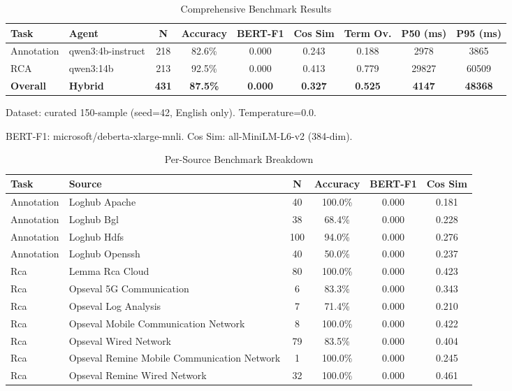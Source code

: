
\begin{table}[h]
\centering
\caption{Comprehensive Benchmark Results}
\label{tab:comprehensive-results}
\begin{tabular}{llccccccc}
\toprule
\textbf{Task} & \textbf{Agent} & \textbf{N} & \textbf{Accuracy} & \textbf{BERT-F1} & \textbf{Cos Sim} & \textbf{Term Ov.} & \textbf{P50 (ms)} & \textbf{P95 (ms)} \\
\midrule
Annotation & qwen3:4b-instruct & 218 & 82.6\% & 0.000 & 0.243 & 0.188 & 2978 & 3865 \\
RCA & qwen3:14b & 213 & 92.5\% & 0.000 & 0.413 & 0.779 & 29827 & 60509 \\
\midrule
\textbf{Overall} & \textbf{Hybrid} & \textbf{431} & \textbf{87.5\%} & \textbf{0.000} & \textbf{0.327} & \textbf{0.525} & \textbf{4147} & \textbf{48368} \\
\bottomrule
\end{tabular}
\begin{tablenotes}
\small
\item Dataset: curated 150-sample (seed=42, English only). Temperature=0.0.
\item BERT-F1: microsoft/deberta-xlarge-mnli. Cos Sim: all-MiniLM-L6-v2 (384-dim).
\end{tablenotes}
\end{table}


\begin{table}[h]
\centering
\caption{Per-Source Benchmark Breakdown}
\label{tab:per-source}
\begin{tabular}{llcccc}
\toprule
\textbf{Task} & \textbf{Source} & \textbf{N} & \textbf{Accuracy} & \textbf{BERT-F1} & \textbf{Cos Sim} \\
\midrule
Annotation & Loghub Apache & 40 & 100.0\% & 0.000 & 0.181 \\
Annotation & Loghub Bgl & 38 & 68.4\% & 0.000 & 0.228 \\
Annotation & Loghub Hdfs & 100 & 94.0\% & 0.000 & 0.276 \\
Annotation & Loghub Openssh & 40 & 50.0\% & 0.000 & 0.237 \\
Rca & Lemma Rca Cloud & 80 & 100.0\% & 0.000 & 0.423 \\
Rca & Opseval 5G Communication & 6 & 83.3\% & 0.000 & 0.343 \\
Rca & Opseval Log Analysis & 7 & 71.4\% & 0.000 & 0.210 \\
Rca & Opseval Mobile Communication Network & 8 & 100.0\% & 0.000 & 0.422 \\
Rca & Opseval Wired Network & 79 & 83.5\% & 0.000 & 0.404 \\
Rca & Opseval Remine Mobile Communication Network & 1 & 100.0\% & 0.000 & 0.245 \\
Rca & Opseval Remine Wired Network & 32 & 100.0\% & 0.000 & 0.461 \\
\bottomrule
\end{tabular}
\end{table}



